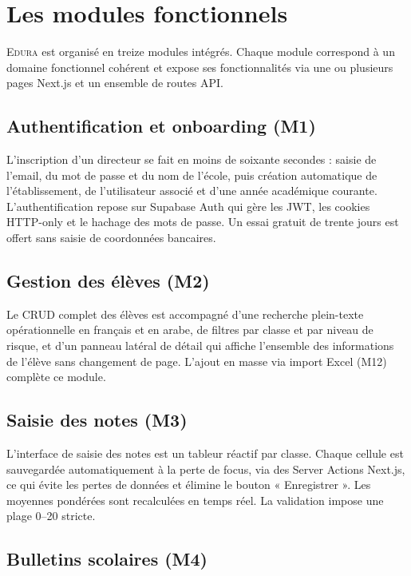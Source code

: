 \documentclass[12pt,a4paper,oneside]{report}
\newcommand{\edura}{\textsc{Edura}}
\begin{document}
\section{Les modules fonctionnels}

\edura{} est organisé en treize modules intégrés. Chaque module correspond à un domaine fonctionnel cohérent et expose ses fonctionnalités via une ou plusieurs pages Next.js et un ensemble de routes API.

\subsection{Authentification et onboarding (M1)}

L'inscription d'un directeur se fait en moins de soixante secondes : saisie de l'email, du mot de passe et du nom de l'école, puis création automatique de l'établissement, de l'utilisateur associé et d'une année académique courante. L'authentification repose sur Supabase Auth qui gère les JWT, les cookies HTTP-only et le hachage des mots de passe. Un essai gratuit de trente jours est offert sans saisie de coordonnées bancaires.

\subsection{Gestion des élèves (M2)}

Le CRUD complet des élèves est accompagné d'une recherche plein-texte opérationnelle en français et en arabe, de filtres par classe et par niveau de risque, et d'un panneau latéral de détail qui affiche l'ensemble des informations de l'élève sans changement de page. L'ajout en masse via import Excel (M12) complète ce module.

\subsection{Saisie des notes (M3)}

L'interface de saisie des notes est un tableur réactif par classe. Chaque cellule est sauvegardée automatiquement à la perte de focus, via des Server Actions Next.js, ce qui évite les pertes de données et élimine le bouton « Enregistrer ». Les moyennes pondérées sont recalculées en temps réel. La validation impose une plage 0--20 stricte.

\subsection{Bulletins scolaires (M4)}
\end{document}
